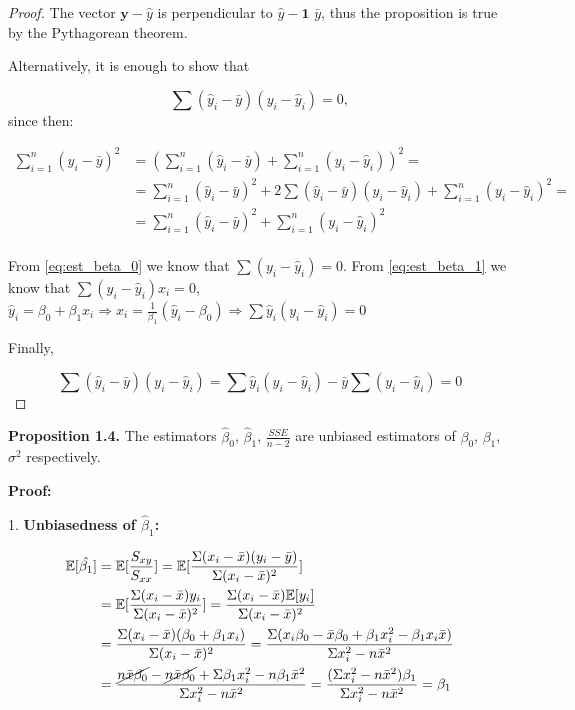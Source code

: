 \documentclass[12pt,a4paper,oneside]{book} %
\begin{document}
\begin{proof}The vector $\textbf{y} - \textbf{$\hat{y}$}$ is perpendicular to $\textbf{$\hat{y}$} - \textbf{1 $\bar{y}$}$, thus the proposition is true by the Pythagorean theorem.

Alternatively, it is enough to show that

\[
	\sum (\hat{y}_i-\bar{y})(y_i-\hat{y}_i) = 0	,
\] since then:

\begin{align*}
	\sum_{i=1}^{n} (y_i - \bar{y})^2 &= (\sum_{i=1}^{n} (\hat{y}_i - \bar{y}) + \sum_{i=1}^{n} (y_i - \hat{y}_i))^2 = \\
	&= \sum_{i=1}^{n} (\hat{y}_i - \bar{y})^2 + 2\sum (\hat{y}_i-\bar{y})(y_i-\hat{y}_i)+ \sum_{i=1}^{n} (y_i - \hat{y}_i)^2 = \\
	&= \sum_{i=1}^{n} (\hat{y}_i - \bar{y})^2 + \sum_{i=1}^{n} (y_i - \hat{y}_i)^2 \\
\end{align*}

From \ref{eq:est_beta_0} we know that $\sum (y_i-\hat{y}_i)=0$.
From \ref{eq:est_beta_1} we know that $\sum (y_i-\hat{y}_i)x_i=0$,
$\hat{y}_i = \beta_0 + \beta_1 x_i \Rightarrow x_i = \frac{1}{\beta_1}(\hat{y}_i-\beta_0) \Rightarrow \sum \hat{y}_i (y_i-\hat{y}_i)=0$

Finally, 

\[
	\sum (\hat{y}_i-\bar{y})(y_i-\hat{y}_i) = \sum \hat{y}_i(y_i-\hat{y}_i)-\bar{y}\sum (y_i-\hat{y}_i)=0	
\]


\end{proof}


\textbf{Proposition 1.4.} The estimators $\hat{\beta}_0$, $\hat{\beta}_1$, $\frac{SSE}{n-2}$ are unbiased estimators of $\beta_0$, $\beta_1$, $\sigma^2$ respectively.



\textbf{Proof:}

1. \textbf{Unbiasedness of $\hat{\beta}_1$:}


\begin{align*}
	\mathbb{E} [ \hat{\beta _1} ] &= \mathbb{E} [\frac{S_{xy}}{S_{xx}}] = \mathbb{E} [\frac{\Sigma (x_i - \bar{x})(y_i-\bar{y})}{\Sigma (x_i-\bar{x})^2}] \\
		&= \mathbb{E} [\frac{\Sigma (x_i - \bar{x})y_i}{\Sigma (x_i-\bar{x})^2}]=
	\frac{\Sigma (x_i - \bar{x})\mathbb{E} [y_i]}{\Sigma (x_i-\bar{x})^2}\\
		&= \frac{\Sigma (x_i - \bar{x})(\beta_0+\beta_1x_i)}{\Sigma (x_i-\bar{x})^2}=	
	\frac{\Sigma (x_i \beta_0 - \bar{x}\beta_0+\beta_1x_i^2-\beta_1x_i\bar{x})}{\Sigma x_i^2-n\bar{x}^2}\\
		&= \frac{\cancel{n\bar{x}\beta_0}-\cancel{n\bar{x}\beta_0}+\Sigma\beta_1x_i^2-n\beta_1\bar{x}^2}{\Sigma x_i^2-n\bar{x}^2}= \frac{(\Sigma x_i^2-n\bar{x}^2)\beta_1}{\Sigma x_i^2-n\bar{x}^2} = \beta_1 
\end{align*}
\end{document}

